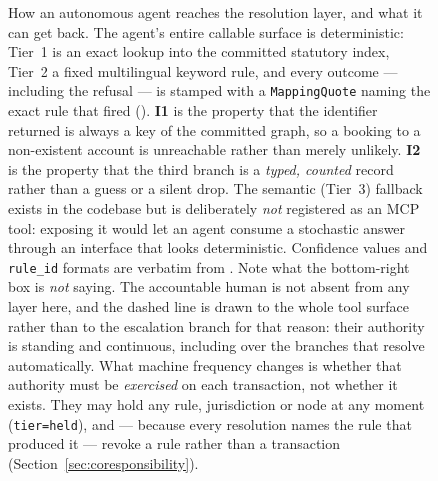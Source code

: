 \begin{figure}[t]
{\begin{tikzpicture}
\end{tikzpicture}%
}
\caption{How an autonomous agent reaches the resolution layer, and what it can
get back. The agent's entire callable surface is deterministic: Tier~1 is an
exact lookup into the committed statutory index, Tier~2 a fixed multilingual
keyword rule, and every outcome --- including the refusal --- is stamped with a
\texttt{MappingQuote} naming the exact rule that fired
(\protect{}). \textbf{I1} is the property that
the identifier returned is always a key of the committed graph, so a booking to
a non-existent account is unreachable rather than merely unlikely. \textbf{I2}
is the property that the third branch is a \emph{typed, counted} record rather
than a guess or a silent drop. The semantic (Tier~3) fallback exists in the
codebase but is deliberately \emph{not} registered as an MCP tool: exposing it
would let an agent consume a stochastic answer through an interface that looks
deterministic. Confidence values and \texttt{rule\_id} formats are verbatim from
\protect{}. Note what the bottom-right box is
\emph{not} saying. The accountable human is not absent from any layer here, and
the dashed line is drawn to the whole tool surface rather than to the escalation
branch for that reason: their authority is standing and continuous, including
over the branches that resolve automatically. What machine frequency changes is
whether that authority must be \emph{exercised} on each transaction, not whether
it exists. They may hold any rule, jurisdiction or node at any moment
(\texttt{tier=held}), and --- because every resolution names the rule that
produced it --- revoke a rule rather than a transaction
(Section~\ref{sec:coresponsibility}).}
\label{fig:agent-flow}
\end{figure}
